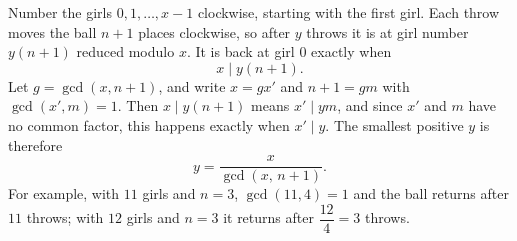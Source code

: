 Number the girls $0,1,\dots,x-1$ clockwise, starting with the first girl. Each throw moves the ball $n+1$ places clockwise, so after $y$ throws it is at girl number $y(n+1)$ reduced modulo $x$. It is back at girl $0$ exactly when
\[x \mid y(n+1).\]
Let $g=\gcd(x,n+1)$, and write $x=gx'$ and $n+1=gm$ with $\gcd(x',m)=1$. Then $x\mid y(n+1)$ means $x'\mid ym$, and since $x'$ and $m$ have no common factor, this happens exactly when $x'\mid y$. The smallest positive $y$ is therefore
\[\boxed{y=\dfrac{x}{\gcd(x,\,n+1)}}.\]
For example, with $11$ girls and $n=3$, $\gcd(11,4)=1$ and the ball returns after $11$ throws; with $12$ girls and $n=3$ it returns after $\dfrac{12}{4}=3$ throws.
